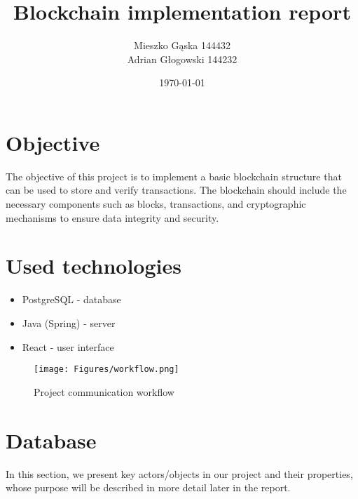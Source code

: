 \documentclass[
	letterpaper, %
	10pt, %
]{CSUniSchoolLabReport}
\title{\textbf{Blockchain implementation report}} %
\author{Mieszko Gąska 144432 \\ Adrian Głogowski 144232} %
\date{\today} %
\begin{document}
\maketitle %
\newpage

\tableofcontents
\newpage
\section{Objective}
The objective of this project is to implement a basic blockchain structure that can be used to store and verify transactions. The blockchain should include the necessary components such as blocks, transactions, and cryptographic mechanisms to ensure data integrity and security.

 
\section{Used technologies}

\begin{itemize}
    \item PostgreSQL - database
	\item Java (Spring) - server
    \item React - user interface
\end{itemize}

\begin{figure}[hbt!]
    \centering
    \texttt{[image: Figures/workflow.png]}
    \caption{Project communication workflow}
\end{figure}

\newpage
\section{Database}
In this section, we present key actors/objects in our project and their properties, whose purpose will be described in more detail later in the report. 
\end{document}

